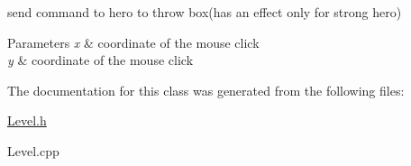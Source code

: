 send command to hero to throw box(has an effect only for strong hero) 


\begin{DoxyParams}{Parameters}
{\em x} & coordinate of the mouse click \\
\hline
{\em y} & coordinate of the mouse click \\
\hline
\end{DoxyParams}


The documentation for this class was generated from the following files\+:\begin{DoxyCompactItemize}
\item 
\hyperlink{_level_8h}{Level.\+h}\item 
Level.\+cpp\end{DoxyCompactItemize}

